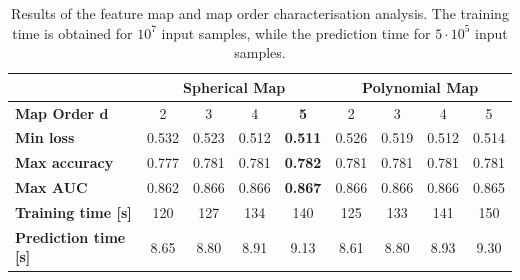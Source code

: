 \documentclass[xcolor=table,8pt]{beamer}
\begin{document}
\begin{frame}[t]
        \vspace{5pt}
        \begin{table}[!h]
            \centering
            \begin{tabular}{l| cccc |cccc}
                \toprule
                & \multicolumn{4}{c|}{\textbf{Spherical Map}} &
                  \multicolumn{4}{c}{\textbf{Polynomial Map}}\\
                \midrule
                \textbf{Map Order \( \boldsymbol{d} \)}       & 2 & 3 & 4 & \alert{\bfseries 5}                & 2 & 3 & 4 & 5 \\
                \midrule
                \textbf{Min loss}       &0.532 & 0.523 & 0.512 & {\alert{\bfseries 0.511}} & 0.526 & 0.519 & 0.512 & 0.514 \\  
                \textbf{Max accuracy}   &0.777 & 0.781 & 0.781 & {\alert{\bfseries 0.782}} & 0.781 & 0.781 & 0.781 & 0.781 \\ 
                \textbf{Max AUC}        &0.862 & 0.866 & 0.866 & {\alert{\bfseries 0.867}} & 0.866 & 0.866 & 0.866 & 0.865 \\
                \midrule
                \textbf{Training time [s]}   & 120 & 127 & 134 & 140 & 125 & 133 & 141 & 150 \\
                \textbf{Prediction time [s]} & 8.65 & 8.80 & 8.91 & 9.13 & 8.61 & 8.80 & 8.93 & 9.30 \\
                \bottomrule
            \end{tabular}
            \caption{Results of the feature map and map order characterisation analysis. The training time is obtained for \( 10^{7} \) input samples, while the prediction time for \( 5 \cdot 10^{5} \) input samples.}
            \label{tab:results_characterisation_map}
        \end{table}
    \end{frame}
\end{document}
